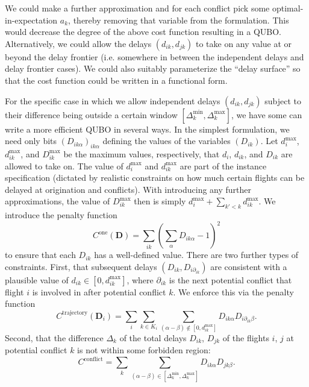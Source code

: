 \documentclass{article}
\begin{document}
We could make a further approximation and for each conflict pick some optimal-in-expectation $a_k$, thereby removing that variable from the formulation.
This would decrease the degree of the above cost function resulting in a QUBO.
Alternatively, we could allow the delays $(d_{ik}, d_{jk})$ to take on any value at or beyond the delay frontier (i.e. somewhere in between the independent delays and delay frontier cases).
We could also suitably parameterize the ``delay surface'' so that the cost function could be written in a functional form.

For the specific case in which we allow independent delays $(d_{ik}, d_{jk})$ subject to their difference being outside a certain window $[\Delta_k^{\mathrm{min}}, \Delta_k^{\mathrm{max}}]$, we have some can write a more efficient QUBO in several ways. 
In the simplest formulation, we need only bits $\left(D_{ik\alpha}\right)_{ik\alpha}$ defining the values of the variables $\left(D_{ik}\right)$. 
Let $d_i^{\mathrm{max}}$, $d_{ik}^{\mathrm{max}}$, and $D_{ik}^{\mathrm{max}}$ be the maximum values, respectively, that $d_i$, $d_{ik}$, and $D_{ik}$ are allowed to take on.
The value of $d_i^{\mathrm{max}}$ and $d_{ik}^{\mathrm{max}}$ are part of the instance specification (dictated by realistic constraints on how much certain flights can be delayed at origination and conflicts).
With introducing any further approximations, the value of $D_{ik}^{\mathrm{max}}$ then is simply $d_{i}^{\mathrm{max}} + \sum_{k' < k} d_{ik}^{\mathrm{max}}$.
We introduce the penalty function
\begin{equation*}
  C^{\mathrm{one}}(\mathbf D)
  = \sum_{ik} \left(\sum_{\alpha} D_{ik\alpha} - 1\right)^2
\end{equation*}
to ensure that each $D_{ik}$ has a well-defined value.
There are two further types of constraints.
First, that subsequent delays $(D_{ik}, D_{i\partial_{ik}})$ are consistent with a plausible value of $d_{ik} \in [0, d_{ik}^{\mathrm{max}}]$, where $\partial_{ik}$ is the next potential conflict that flight $i$ is involved in after potential conflict $k$.
We enforce this via the penalty function
\begin{equation*}
  C^{\mathrm{trajectory}}
  (\mathbf D_i)
  =
  \sum_i \sum_{k \in K_i}
\sum_{(\alpha - \beta) \notin [0, d_{ik}^{\mathrm{max}}]}
D_{ik\alpha} D_{i \partial_{ik} \beta}.
\end{equation*}
Second, that the difference $\Delta_k$ of the total delays $D_{ik}$, $D_{jk}$ of the flights $i$, $j$ at potential conflict $k$ is not within some forbidden region:
\begin{equation*}
C^{\mathrm{conflict}}
= \sum_k \sum_{(\alpha - \beta) \in [\Delta_k^{\mathrm{min}}, \Delta_k^{\mathrm{max}}]} D_{ik\alpha} D_{jk\beta}.
\end{equation*}
\end{document}
